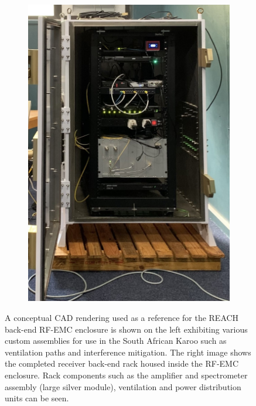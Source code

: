 \begin{figure}
\begin{subfigure}{.4\textwidth}
        \includegraphics[width=\linewidth]{backend}
    \end{subfigure}
    \caption{A conceptual CAD rendering used as a reference for the REACH back-end RF-EMC enclosure is shown on the left exhibiting various custom assemblies for use in the South African Karoo such as ventilation paths and interference mitigation. The right image shows the completed receiver back-end rack housed inside the RF-EMC enclosure. Rack components such as the amplifier and spectrometer assembly (large silver module), ventilation and power distribution units can be seen.}
    \label{fig:backend}
\end{figure}

